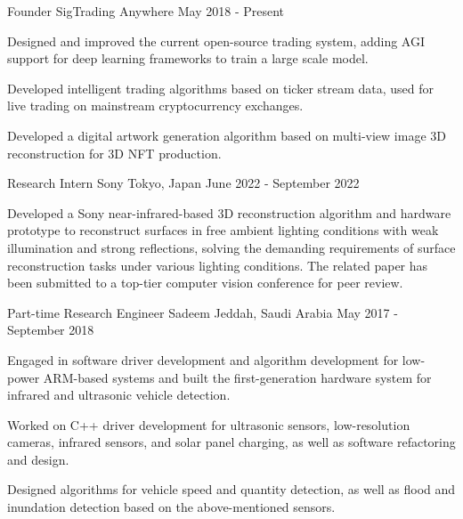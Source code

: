 

\begin{cventries}

\cventry
{Founder} %
{SigTrading} %
{Anywhere} %
{May 2018 - Present} %
{
	\begin{cvitems} %
		\item {Designed and improved the current open-source trading system, adding AGI support for deep learning frameworks to train a large scale model.}
		\item {Developed intelligent trading algorithms based on ticker stream data, used for live trading on mainstream cryptocurrency exchanges.}
		\item {Developed a digital artwork generation algorithm based on multi-view image 3D reconstruction for 3D NFT production.}
	\end{cvitems}
}

\cventry
{Research Intern} %
{Sony} %
{Tokyo, Japan} %
{June 2022 - September 2022} %
{
	\begin{cvitems} %
		\item {Developed a Sony near-infrared-based 3D reconstruction algorithm and hardware prototype to reconstruct surfaces in free ambient lighting conditions with weak illumination and strong reflections, solving the demanding requirements of surface reconstruction tasks under various lighting conditions. The related paper has been submitted to a top-tier computer vision conference for peer review.}
	\end{cvitems}
}

\cventry
{Part-time Research Engineer} %
{Sadeem} %
{Jeddah, Saudi Arabia} %
{May 2017 - September 2018} %
{
	\begin{cvitems} %
		\item {Engaged in software driver development and algorithm development for low-power ARM-based systems and built the first-generation hardware system for infrared and ultrasonic vehicle detection.}
		\item {Worked on C++ driver development for ultrasonic sensors, low-resolution cameras, infrared sensors, and solar panel charging, as well as software refactoring and design.}
		\item {Designed algorithms for vehicle speed and quantity detection, as well as flood and inundation detection based on the above-mentioned sensors.}
	\end{cvitems}
}


\end{cventries}
